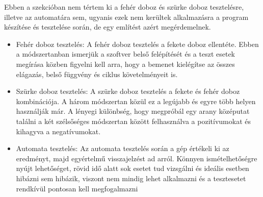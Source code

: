 
Ebben a szekcióban nem tértem ki a fehér doboz és szürke doboz tesztelésre, illetve az automatára sem, ugyanis ezek nem kerültek alkalmazásra a program készítése és tesztelése során, de egy említést azért megérdemelnek.

\begin{itemize}
\item Fehér doboz tesztelés: A fehér doboz tesztelés a fekete doboz ellentéte. Ebben a módszertanban ismerjük a szoftver belső felépítését és a teszt esetek megírása közben figyelni kell arra, hogy a bemenet kielégítse az összes elágazás, belső függvény és ciklus követelményeit is.

\item Szürke doboz tesztelés: A szürke doboz tesztelés a fekete és fehér doboz kombinációja. A három módszertan közül ez a legújabb és egyre több helyen használják már. A lényegi különbség, hogy megpróbál egy arany középutat találni a két szélsőséges módszertan között felhasználva a pozitívumokat és kihagyva a negatívumokat.

\item Automata tesztelés: Az automata tesztelés során a gép értékeli ki az eredményt, majd egyértelmű visszajelzést ad arról. Könnyen ismételhetőségre nyújt lehetőséget, rövid idő alatt sok esetet tud vizsgálni és ideális esetben hibázni sem hibázik, viszont nem mindig lehet alkalmazni és a tesztesetet rendkívül pontosan kell megfogalmazni
\end{itemize}